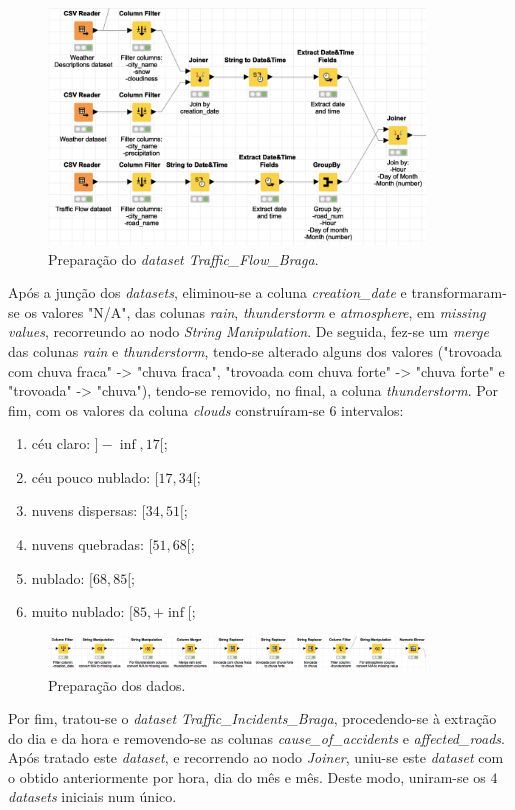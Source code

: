 \documentclass[a4paper, 12pt]{article}
\begin{document}
\begin{figure}[H]
	\centering
	\includegraphics[width=10cm]{join}
	\caption{Preparação do \textit{dataset Traffic\_Flow\_Braga}.}
\end{figure}

Após a junção dos \textit{datasets}, eliminou-se a coluna \textit{creation\_date} e transformaram-se os valores "N/A", das colunas \textit{rain}, \textit{thunderstorm} e \textit{atmosphere}, em \textit{missing values}, recorreundo ao nodo \textit{String Manipulation}. De seguida, fez-se um \textit{merge} das colunas \textit{rain} e \textit{thunderstorm}, tendo-se alterado alguns dos valores ("trovoada com chuva fraca" -> "chuva fraca", "trovoada com chuva forte" -> "chuva forte" e "trovoada" -> "chuva"), tendo-se removido, no final, a coluna \textit{thunderstorm}. Por fim, com os valores da coluna \textit{clouds} construíram-se 6 intervalos:

\begin{enumerate}
	\item céu claro: $]-\inf,17[$;
	\item céu pouco nublado: $[17,34[$;
	\item nuvens dispersas: $[34,51[$;
	\item nuvens quebradas: $[51,68[$;
	\item nublado: $[68,85[$;
	\item muito nublado: $[85,+\inf[$;
\end{enumerate}

\begin{figure}[H]
	\centering
	\includegraphics[width=10cm]{prep}
	\caption{Preparação dos dados.}
\end{figure}

Por fim, tratou-se o \textit{dataset Traffic\_Incidents\_Braga}, procedendo-se à extração do dia e da hora e removendo-se as colunas \textit{cause\_of\_accidents} e \textit{affected\_roads}. Após tratado este \textit{dataset}, e recorrendo ao nodo \textit{Joiner}, uniu-se este \textit{dataset} com o obtido anteriormente por hora, dia do mês e mês. Deste modo, uniram-se os $4$ \textit{datasets} iniciais num único.
\end{document}
